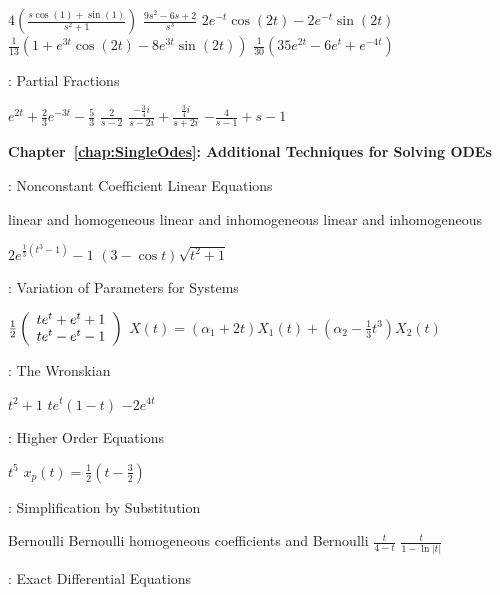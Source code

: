  \ans $4\left(\frac{s\cos(1) + \sin(1)}{s^2 + 1}\right)$
 \ans $\frac{9s^2 - 6s + 2}{s^3}$
 \ans $2e^{-t}\cos(2t) - 2e^{-t}\sin(2t)$
 \ans 
$\frac{1}{13}\left(1 + e^{3t}\cos(2t) - 8e^{3t}\sin(2t)\right)$
 \ans $\frac{1}{30}(35e^{2t}-6e^t+e^{-4t})$



: Partial Fractions

 \ans $e^{2t}+\frac{2}{3}e^{-3t}-\frac{5}{3}$
 \ans $\frac{2}{s - 2}$
 \ans 
$\frac{-\frac{3}{4}i}{s - 2i} + \frac{\frac{3}{4}i}{s + 2i}$
 \ans $-\frac{4}{s - 1} + s - 1$




\vspace{0.08in}


{\bf Chapter~\ref{chap:SingleOdes}: Additional Techniques for Solving ODEs}


: Nonconstant Coefficient Linear Equations

 linear and homogeneous
 linear and inhomogeneous
 linear and inhomogeneous

 \ans $2e^{\frac{1}{3}(t^3 - 1)} - 1$
 \ans $(3 - \cos t)\sqrt{t^2 + 1}$


: Variation of Parameters for Systems

 \ans $\frac{1}{2}\left(\begin{array}{c} te^t + e^t + 1 \\ te^t - e^t - 1\end{array}\right)$
 \ans $X(t)=(\alpha_1+2t)X_1(t) + 
\left(\alpha_2-\frac{1}{3}t^3 \right)X_2(t)$


: The Wronskian

 \ans $t^2 + 1$
 \ans $te^t(1 - t)$
 \ans $-2e^{4t}$


: Higher Order Equations

 \ans $t^5$
 \ans $x_p(t) = \frac{1}{2}(t-\frac{3}{2})$


: Simplification by Substitution

 \ans Bernoulli
 \ans Bernoulli
 \ans homogeneous coefficients and Bernoulli
 \ans $\frac{t}{4-t}$
 \ans $\frac{t}{1-\ln|t|}$


: Exact Differential Equations

